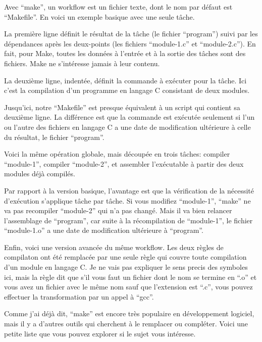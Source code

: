 \documentclass[12pt]{article}
\begin{document}
\newpage

Avec ``make'', un workflow est un fichier texte, dont le nom par
défaut est ``Makefile''. En voici un exemple basique avec une seule
tâche.

La première ligne définit le résultat de la tâche (le fichier
``program'') suivi par les dépendances après les deux-points (les
fichiers ``module-1.c'' et  ``module-2.c''). En fait, pour Make,
toutes les données à l'entrée et à la sortie des tâches sont des
fichiers. Make ne s'intéresse jamais à leur contenu.

La deuxième ligne, indentée, définit la commande à exécuter pour
la tâche. Ici c'est la compilation d'un programme en langage C
consistant de deux modules.

Jusqu'ici, notre ``Makefile'' est presque équivalent à un script qui
contient sa deuxième ligne. La différence est que la commande est
exécutée seulement si l'un ou l'autre des fichiers en langage C a une
date de modification ultérieure à celle du résultat, le fichier
``program''.

\newpage

Voici la même opération globale, mais découpée en trois tâches:
compiler ``module-1'', compiler ``module-2'', et assembler
l'exécutable à partir des deux modules déjà compilés.

Par rapport à la version basique, l'avantage est que la vérification
de la nécessité d'exécution s'applique tâche par tâche. Si vous
modifiez ``module-1'', ``make'' ne va pas recompiler ``module-2'' qui
n'a pas changé. Mais il va bien relancer l'assemblage de ``program'',
car suite à la récompilation de ``module-1'', le fichier
``module-1.o'' a une date de modification ultérieure à ``program''.

\newpage

Enfin, voici une version avancée du même workflow. Les deux règles de
compilaton ont été remplacée par une seule règle qui couvre toute
compilation d'un module en langage C. Je ne vais pas expliquer le sens
precis des symboles ici, mais la règle dit que s'il vous faut
un fichier dont le nom se termine en ``.o'' et vous avez un fichier
avec le même nom sauf que l'extension est ``.c'', vous pouvez effectuer
la transformation par un appel à ``gcc''.

\newpage

Comme j'ai déjà dit, ``make'' est encore très populaire en
développement logiciel, mais il y a d'autres outils qui cherchent à le
remplacer ou compléter. Voici une petite liste que vous pouvez
explorer si le sujet vous intéresse.
\end{document}
